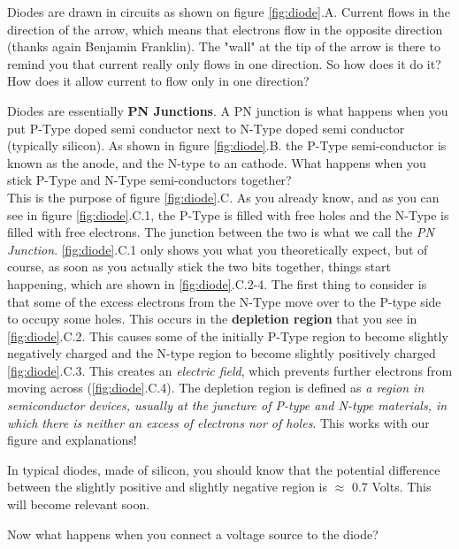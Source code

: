 Diodes are drawn in circuits as shown on figure \ref{fig:diode}.A. Current flows in the direction of the arrow, which means that electrons flow in the opposite direction (thanks again Benjamin Franklin). The "wall" at the tip of the arrow is there to remind you that current really only flows in one direction. So how does it do it? How does it allow current to flow only in one direction? 

Diodes are essentially \textbf{PN Junctions}. A PN junction is what happens when you put P-Type doped semi conductor next to N-Type doped semi conductor (typically silicon). As shown in figure \ref{fig:diode}.B. the P-Type semi-conductor is known as the anode, and the N-type to an cathode. What happens when you stick P-Type and N-Type semi-conductors together? \\

This is the purpose of figure \ref{fig:diode}.C. As you already know, and as you can see in figure \ref{fig:diode}.C.1, the P-Type is filled with free holes and the N-Type is filled with free electrons. The junction between the two is what we call the \textit{PN Junction}. \ref{fig:diode}.C.1 only shows you what you theoretically expect, but of course, as soon as you actually stick the two bits together, things start happening, which are shown in \ref{fig:diode}.C.2-4. The first thing to consider is that some of the excess electrons from the N-Type move over to the P-type side to occupy some holes. This occurs in the \textbf{depletion region} that you see in \ref{fig:diode}.C.2. This causes some of the initially P-Type region to become slightly negatively charged and the N-type region to become slightly positively charged \ref{fig:diode}.C.3. This creates an \textit{electric field}, which prevents further electrons from moving across (\ref{fig:diode}.C.4). The depletion region is defined as \textit{a region in semiconductor devices, usually at the juncture of P-type and N-type materials, in which there is neither an excess of electrons nor of holes}. This works with our figure and explanations! 

In typical diodes, made of silicon, you should know that the potential difference between the slightly positive and slightly negative region is $\approx$ 0.7 Volts. This will become relevant soon.

Now what happens when you connect a voltage source to the diode? \\


